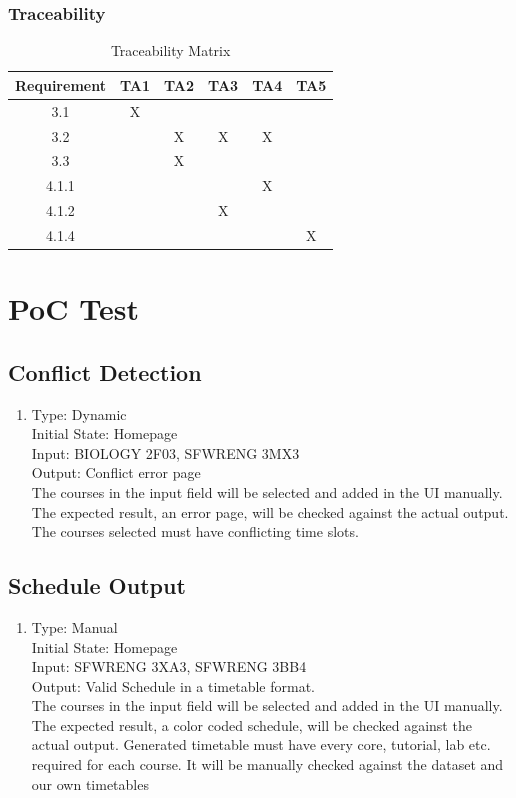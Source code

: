 \documentclass[11pt, oneside]{article}   	%
\begin{document}
\subsubsection{Traceability}
\begin{table}[h]
\begin{center}
\begin{tabular}{ | c | c | c | c | c | c | }
\hline
 Requirement & TA1 & TA2 & TA3 & TA4 & TA5  \\ 
\hline
 3.1 & X & & & &   \\  
\hline
 3.2 & & X & X & X & \\
\hline
 3.3 & & X & & &\\
\hline 
 4.1.1 & & & & X & \\ 
\hline
 4.1.2 & & & X & & \\
\hline
  4.1.4 & & & & & X \\
\hline
\end{tabular}
\end{center}
\caption{Traceability Matrix}
\end{table}
\newpage

\section{PoC Test}

\subsection{Conflict Detection}
\begin{enumerate}
\item Type: Dynamic \\
Initial State: Homepage \\
Input: BIOLOGY 2F03, SFWRENG 3MX3 \\
Output: Conflict error page \\
The courses in the input field will be selected and added in the UI manually. The expected result, an error page, will be checked against the actual output. The courses selected must have conflicting time slots. \\
\end{enumerate}

\subsection{Schedule Output}
\begin{enumerate}
\item Type: Manual \\
Initial State: Homepage \\
Input: SFWRENG 3XA3, SFWRENG 3BB4 \\
Output: Valid Schedule in a timetable format. \\
The courses in the input field will be selected and added in the UI manually. The expected result, a color coded schedule, will be checked against the actual output. Generated timetable must have every core, tutorial, lab etc. required for each course. It will be manually checked against the dataset and our own timetables \\
\end{enumerate}
\end{document}
